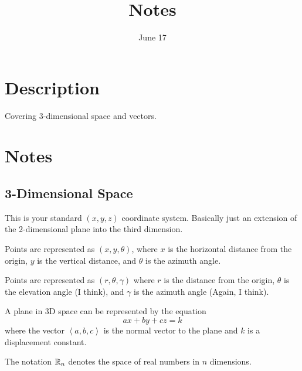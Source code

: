 \documentclass[12pt]{scrartcl}
\title{Notes}
\date{June 17}
\begin{document}
\maketitle

\pagebreak

\section{Description}

Covering 3-dimensional space and vectors.

\section{Notes}

\subsection{3-Dimensional Space}

\begin{definition}
    This is your standard $(x, y, z)$ coordinate system. Basically just an extension of the 2-dimensional plane into the third dimension.
\end{definition}

\begin{definition}
    Points are represented as $(x, y, \theta)$, where $x$ is the horizontal distance from the origin, $y$ is the vertical distance, and $\theta$ is the azimuth angle.
\end{definition}

\begin{definition}
    Points are represented as $(r, \theta, \gamma)$ where $r$ is the distance from the origin, $\theta$ is the elevation angle (I think), and $\gamma$ is the azimuth angle (Again, I think).
\end{definition}

\begin{definition}
    A plane in 3D space can be represented by the equation
    \[ax + by + cz = k\]
    where the vector $\left<a, b, c\right>$ is the normal vector to the plane and $k$ is a displacement constant.
\end{definition}

\begin{definition}
    The notation $\mathbb R_{n}$ denotes the space of real numbers in $n$ dimensions.
\end{definition}
\end{document}
